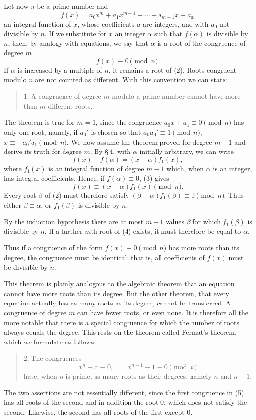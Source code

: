 \documentclass[11pt]{article}
\begin{document}
Let now $n$ be a prime number and
\[
\tag{1}        f(x)=a_0x^m+a_1x^{m-1}+\cdots+a_{m-1}x+a_m
\]
an integral function of $x$, whose coefficients $a$ are integers, and with $a_0$ not divisible by $n$. If we substitute for $x$ an integer $\alpha$ such that $f(\alpha)$ is divisible by $n$, then, by analogy with equations, we say that $\alpha$ is a root of the congruence of degree $m$
\[
\tag{2}        f(x)\equiv0\pmod n.
\]
If $\alpha$ is increased by a multiple of $n$, it remains a root of (2). Roots congruent modulo $n$ are not counted as different. With this convention we can state:
\begin{quote}
1. A congruence of degree $m$ modulo a prime number cannot have more than $m$ different roots.
\end{quote}
The theorem is true for $m=1$, since the congruence $a_0x+a_1\equiv0\pmod n$ has only one root, namely, if $a_0'$ is chosen so that $a_0a_0'\equiv1\pmod n$, $x\equiv-a_0'a_1\pmod n$. We now assume the theorem proved for degree $m-1$ and derive its truth for degree $m$. By \S\,4, with $\alpha$ initially arbitrary, we can write
\[
\tag{3}        f(x)-f(\alpha)=(x-\alpha)f_1(x),
\]
where $f_1(x)$ is an integral function of degree $m-1$ which, when $\alpha$ is an integer, has integral coefficients. Hence, if $f(\alpha)\equiv0$, (3) gives
\[
\tag{4}        f(x)\equiv(x-\alpha)f_1(x)\pmod n.
\]
Every root $\beta$ of (2) must therefore satisfy $(\beta-\alpha)f_1(\beta)\equiv0\pmod n$. Thus either $\beta\equiv\alpha$, or $f_1(\beta)$ is divisible by $n$.

By the induction hypothesis there are at most $m-1$ values $\beta$ for which $f_1(\beta)$ is divisible by $n$. If a further $m$th root of (4) exists, it must therefore be equal to $\alpha$.

Thus if a congruence of the form $f(x)\equiv0\pmod n$ has more roots than its degree, the congruence must be identical; that is, all coefficients of $f(x)$ must be divisible by $n$.

This theorem is plainly analogous to the algebraic theorem that an equation cannot have more roots than its degree. But the other theorem, that every equation actually has as many roots as its degree, cannot be transferred. A congruence of degree $m$ can have fewer roots, or even none. It is therefore all the more notable that there is a special congruence for which the number of roots always equals the degree. This rests on the theorem called Fermat's theorem, which we formulate as follows.
\begin{quote}
2. The congruences
\[
\tag{5}        x^n-x\equiv0,\qquad x^{n-1}-1\equiv0\pmod n
\]
have, when $n$ is prime, as many roots as their degrees, namely $n$ and $n-1$.
\end{quote}
The two assertions are not essentially different, since the first congruence in (5) has all roots of the second and in addition the root $0$, which does not satisfy the second. Likewise, the second has all roots of the first except $0$.
\end{document}
